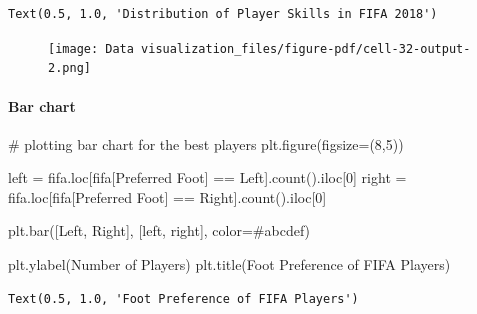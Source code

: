 \documentclass[
  letterpaper,
  DIV=11,
  numbers=noendperiod]{scrreprt}
\let\oldparagraph\paragraph
\renewcommand{\paragraph}[1]{\oldparagraph{#1}\mbox{}}
\newenvironment{Shaded}{\begin{snugshade}}{\end{snugshade}}
\newcommand{\CommentTok}[1]{\textcolor[rgb]{0.37,0.37,0.37}{#1}}
\newcommand{\DecValTok}[1]{\textcolor[rgb]{0.68,0.00,0.00}{#1}}
\newcommand{\NormalTok}[1]{\textcolor[rgb]{0.00,0.23,0.31}{#1}}
\newcommand{\OperatorTok}[1]{\textcolor[rgb]{0.37,0.37,0.37}{#1}}
\newcommand{\StringTok}[1]{\textcolor[rgb]{0.13,0.47,0.30}{#1}}
\begin{document}
\begin{verbatim}
Text(0.5, 1.0, 'Distribution of Player Skills in FIFA 2018')
\end{verbatim}

\begin{figure}[H]

{\centering \texttt{[image: Data visualization\_files/figure-pdf/cell-32-output-2.png]}

}

\end{figure}

\hypertarget{bar-chart}{%
\paragraph{Bar chart}\label{bar-chart}}

\begin{Shaded}
\begin{Highlighting}[]
\CommentTok{\# plotting bar chart for the best players}
\NormalTok{plt.figure(figsize}\OperatorTok{=}\NormalTok{(}\DecValTok{8}\NormalTok{,}\DecValTok{5}\NormalTok{))}

\NormalTok{left }\OperatorTok{=}\NormalTok{ fifa.loc[fifa[}\StringTok{\textquotesingle{}Preferred Foot\textquotesingle{}}\NormalTok{] }\OperatorTok{==} \StringTok{\textquotesingle{}Left\textquotesingle{}}\NormalTok{].count().iloc[}\DecValTok{0}\NormalTok{]}
\NormalTok{right }\OperatorTok{=}\NormalTok{ fifa.loc[fifa[}\StringTok{\textquotesingle{}Preferred Foot\textquotesingle{}}\NormalTok{] }\OperatorTok{==} \StringTok{\textquotesingle{}Right\textquotesingle{}}\NormalTok{].count().iloc[}\DecValTok{0}\NormalTok{]}

\NormalTok{plt.bar([}\StringTok{\textquotesingle{}Left\textquotesingle{}}\NormalTok{, }\StringTok{\textquotesingle{}Right\textquotesingle{}}\NormalTok{], [left, right], color}\OperatorTok{=}\StringTok{\textquotesingle{}\#abcdef\textquotesingle{}}\NormalTok{)}

\NormalTok{plt.ylabel(}\StringTok{\textquotesingle{}Number of Players\textquotesingle{}}\NormalTok{)}
\NormalTok{plt.title(}\StringTok{\textquotesingle{}Foot Preference of FIFA Players\textquotesingle{}}\NormalTok{)}
\end{Highlighting}
\end{Shaded}

\begin{verbatim}
Text(0.5, 1.0, 'Foot Preference of FIFA Players')
\end{verbatim}
\end{document}
